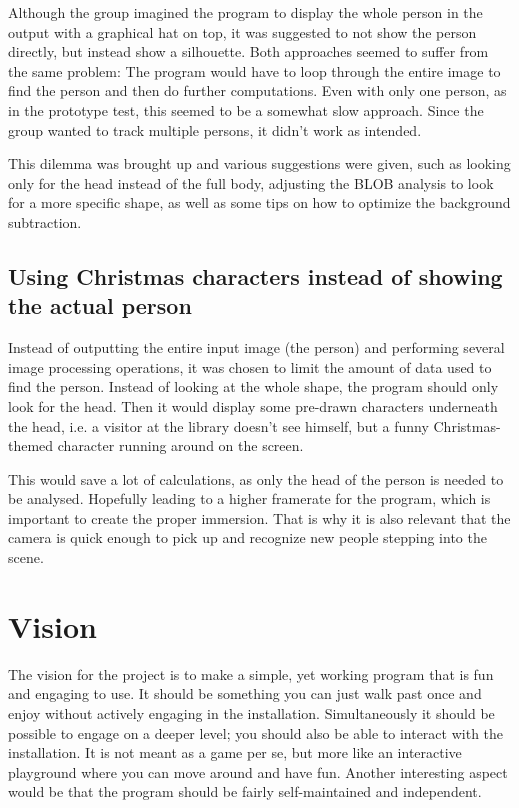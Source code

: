 Although the group imagined the program to display the whole person in the output with a graphical hat on top, it was suggested to not show the person directly, but instead show a silhouette. Both approaches seemed to suffer from the same problem: The program would have to loop through the entire image to find the person and then do further computations. Even with only one person, as in the prototype test, this seemed to be a somewhat slow approach. Since the group wanted to track multiple persons, it didn't work as intended.

This dilemma was brought up and various suggestions were given, such as looking only for the head instead of the full body, adjusting the BLOB analysis to look for a more specific shape, as well as some tips on how to optimize the background subtraction.


\subsection{Using Christmas characters instead of showing the actual person}
Instead of outputting the entire input image (the person) and performing several image processing operations, it was chosen to limit the amount of data used to find the person. Instead of looking at the whole shape, the program should only look for the head. Then it would display some pre-drawn characters underneath the head, i.e. a visitor at the library doesn't see himself, but a funny Christmas-themed character running around on the screen.

This would save a lot of calculations, as only the head of the person is needed to be analysed. Hopefully leading to a higher framerate for the program, which is important to create the proper immersion. That is why it is also relevant that the camera is quick enough to pick up and recognize new people stepping into the scene.
  
\section{Vision}
The vision for the project is to make a simple, yet working program that is fun and engaging to use. It should be something you can just walk past once and enjoy without actively engaging in the installation. Simultaneously it should be possible to engage on a deeper level; you should also be able to interact with the installation. It is not meant as a game per se, but more like an interactive playground where you can move around and have fun. Another interesting aspect would be that the program should be fairly self-maintained and independent.

